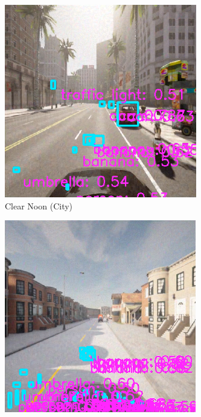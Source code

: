 \begin{figure}[tbp]
    \centering
    \begin{subfigure}[b]{0.22\textwidth}
        \centering
        \includegraphics[width=\linewidth]{figures/chapter_detection/hardware/clear_noon_city.png}
        \caption{Clear Noon (City)}
        \label{fig:clear_noon} 
    \end{subfigure}
    \begin{subfigure}[b]{0.22\textwidth}
        \centering
        \includegraphics[width=\linewidth]{figures/chapter_detection/hardware/clear_noon_urban.png}

\end{subfigure}
\end{figure}
